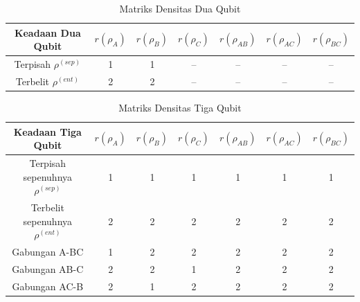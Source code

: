 \noindent
\begin{table}[h]
\centering
\caption{Matriks Densitas Dua Qubit}
\begin{tabular}{|c|c|c|c|c|c|c|}
    \hline
    Keadaan Dua Qubit & $r(\rho_A)$ & $r(\rho_B)$ & $r(\rho_C)$ & $r(\rho_{AB})$ & $r(\rho_{AC})$ & $r(\rho_{BC})$ \\
    \hline
    Terpisah $\rho^{(sep)}$ & 1 & 1 & -- & -- & -- & -- \\
    \hline
    Terbelit $\rho^{(ent)}$ & 2 & 2 & -- & -- & -- & -- \\
    \hline
\end{tabular}
\end{table}

\vspace{0.5cm}

\noindent
\begin{table}[h]
\centering
\caption{Matriks Densitas Tiga Qubit}
\begin{tabular}{|c|c|c|c|c|c|c|}
    \hline
    \textbf{Keadaan Tiga Qubit} & $r(\rho_A)$ & $r(\rho_B)$ & $r(\rho_C)$ & $r(\rho_{AB})$ & $r(\rho_{AC})$ & $r(\rho_{BC})$ \\
    \hline
    Terpisah sepenuhnya $\rho^{(sep)}$ & 1 & 1 & 1 & 1 & 1 & 1 \\
    \hline
    Terbelit sepenuhnya $\rho^{(ent)}$ & 2 & 2 & 2 & 2 & 2 & 2 \\
    \hline
    Gabungan A-BC & 1 & 2 & 2 & 2 & 2 & 2 \\
    \hline
    Gabungan AB-C & 2 & 2 & 1 & 2 & 2 & 2 \\
    \hline
    Gabungan AC-B & 2 & 1 & 2 & 2 & 2 & 2 \\
    \hline
\end{tabular}
\end{table}

